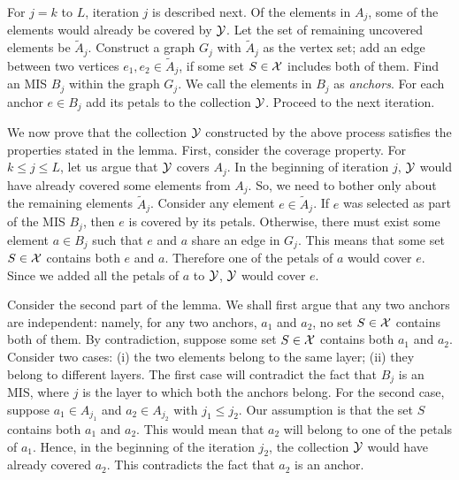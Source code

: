 \documentclass[11pt]{article}
\newcommand{\calY} {{\cal Y}}
\newcommand{\calX} {{\cal X}}
\newcommand{\wt}[1] {\widetilde{#1}}
\begin{document}
For $j=k$ to $L$, iteration $j$ is described next.
Of the elements in $A_j$, some of the elements would already be covered by $\calY$.
Let the set of remaining uncovered elements be $\wt{A}_j$.
Construct a graph $G_j$ with $\wt{A}_j$ as the vertex set; add an edge between two vertices $e_1,e_2\in \wt{A}_j$,
if some set $S\in \calX$ includes both of them. Find an MIS $B_j$ within the graph $G_j$. 
We call the elements in $B_j$ as {\em anchors}.
For each anchor $e\in B_j$ add its petals to the collection $\calY$.
Proceed to the next iteration.

We now prove that the collection $\calY$ constructed by the above process satisfies the
properties stated in the lemma. First, consider the coverage property.
For $k\leq j\leq L$, let us argue that $\calY$ covers $A_j$.
In the beginning of iteration $j$, $\calY$ would have already covered some elements
from $A_j$. So, we need to bother only about the remaining elements $\wt{A}_j$.
Consider any element $e\in \wt{A}_j$. If $e$ was selected as part of the MIS $B_j$,
then $e$ is covered by its petals. Otherwise, there must exist some element $a\in B_j$
such that $e$ and $a$ share an edge in $G_j$. This means that some set $S\in \calX$
contains both $e$ and $a$. Therefore one of the petals of $a$ would cover $e$.
Since we added all the petals of $a$ to $\calY$, $\calY$ would cover $e$.

Consider the second part of the lemma. 
We shall first argue that any two anchors are independent: namely, for any two anchors,
$a_1$ and $a_2$, no set $S\in \calX$ contains both of them.
By contradiction, suppose some set $S\in \calX$ contains both $a_1$ and $a_2$.
Consider two cases: (i) the two elements belong to the same layer;
(ii) they belong to different layers.
The first case will contradict the fact that $B_j$ is an MIS, where $j$ is the layer to which both the anchors belong.
For the second case, suppose $a_1\in A_{j_1}$ and $a_2\in A_{j_2}$ with $j_1\leq j_2$.
Our assumption is that the set $S$ contains both $a_1$ and $a_2$.
This would mean that $a_2$ will belong to one of the petals of $a_1$.
Hence, in the beginning of the iteration $j_2$, the collection $\calY$ would have already covered $a_2$.
This contradicts the fact that $a_2$ is an anchor.
\end{document}
